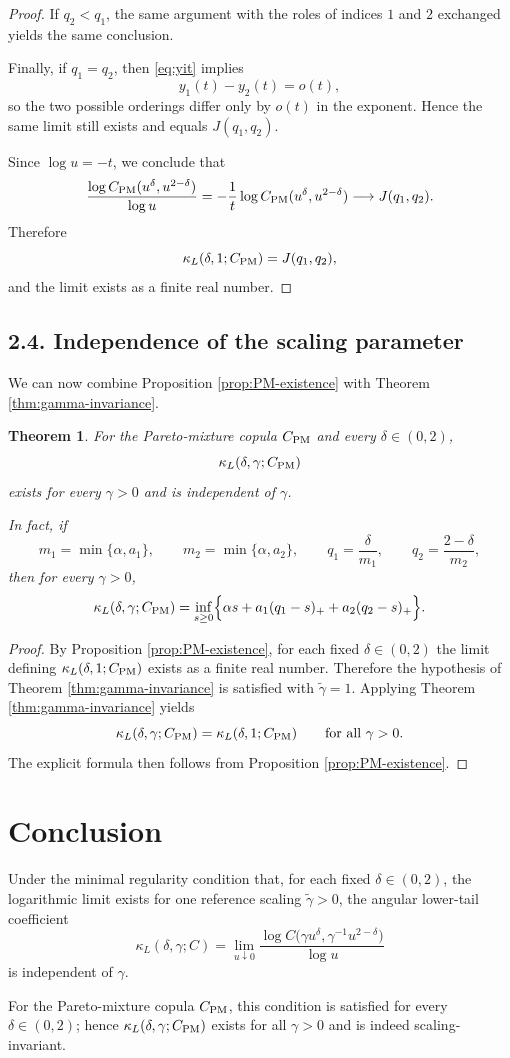 \documentclass[11pt]{article}
\newtheorem{theorem}{Theorem}
\begin{document}
\begin{proof}
If $q_2<q_1$, the same argument with the roles of indices $1$ and $2$ exchanged yields the same conclusion.

Finally, if $q_1=q_2$, then \eqref{eq:yit} implies
\[
y_1(t)-y_2(t)=o(t),
\]
so the two possible orderings differ only by $o(t)$ in the exponent. Hence the same limit still exists and equals $J(q_1,q_2)$.

Since $\log u=-t$, we conclude that
\[
\frac{\log C_{\rm PM}(u^\delta,u^{2-\delta})}{\log u}
=
-\frac{1}{t}\log C_{\rm PM}(u^\delta,u^{2-\delta})
\longrightarrow
J(q_1,q_2).
\]
Therefore
\[
\kappa_L(\delta,1;C_{\rm PM})=J(q_1,q_2),
\]
and the limit exists as a finite real number.
\end{proof}

\subsection*{2.4. Independence of the scaling parameter}

We can now combine Proposition \ref{prop:PM-existence} with Theorem \ref{thm:gamma-invariance}.

\begin{theorem}\label{thm:PM-gamma-independence}
For the Pareto-mixture copula $C_{\rm PM}$ and every $\delta\in(0,2)$,
\[
\kappa_L(\delta,\gamma;C_{\rm PM})
\]
exists for every $\gamma>0$ and is independent of $\gamma$.

In fact, if
\[
m_1=\min\{\alpha,a_1\},
\qquad
m_2=\min\{\alpha,a_2\},
\qquad
q_1=\frac{\delta}{m_1},
\qquad
q_2=\frac{2-\delta}{m_2},
\]
then for every $\gamma>0$,
\[
\kappa_L(\delta,\gamma;C_{\rm PM})
=
\inf_{s\ge 0}
\Bigl\{
\alpha s+a_1(q_1-s)_+ + a_2(q_2-s)_+
\Bigr\}.
\]
\end{theorem}

\begin{proof}
By Proposition \ref{prop:PM-existence}, for each fixed $\delta\in(0,2)$ the limit defining $\kappa_L(\delta,1;C_{\rm PM})$ exists as a finite real number. Therefore the hypothesis of Theorem \ref{thm:gamma-invariance} is satisfied with $\tilde\gamma=1$. Applying Theorem \ref{thm:gamma-invariance} yields
\[
\kappa_L(\delta,\gamma;C_{\rm PM})
=
\kappa_L(\delta,1;C_{\rm PM})
\qquad\text{for all }\gamma>0.
\]
The explicit formula then follows from Proposition \ref{prop:PM-existence}.
\end{proof}

\section*{Conclusion}

Under the minimal regularity condition that, for each fixed $\delta\in(0,2)$, the logarithmic limit exists for one reference scaling $\tilde\gamma>0$, the angular lower-tail coefficient
\[
\kappa_L(\delta,\gamma;C)
=
\lim_{u\downarrow 0}
\frac{\log C\!\bigl(\gamma u^\delta,\gamma^{-1}u^{2-\delta}\bigr)}{\log u}
\]
is independent of $\gamma$.

For the Pareto-mixture copula $C_{\rm PM}$, this condition is satisfied for every $\delta\in(0,2)$; hence $\kappa_L(\delta,\gamma;C_{\rm PM})$ exists for all $\gamma>0$ and is indeed scaling-invariant.
\end{document}
